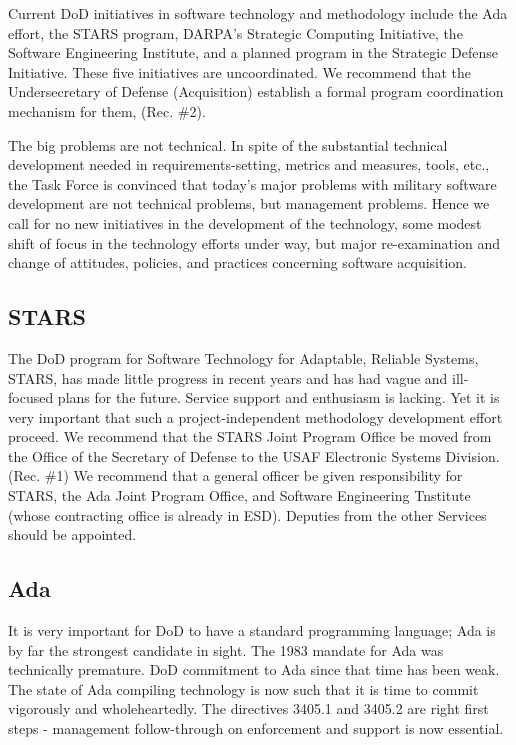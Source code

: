 \documentclass[12pt]{article}
\begin{document}
Current DoD initiatives in software technology and methodology include the Ada
effort, the STARS program, DARPA's Strategic Computing Initiative, the
Software Engineering Institute, and a planned program in the Strategic Defense
Initiative. These five initiatives are uncoordinated. We recommend that the
Undersecretary of Defense (Acquisition) establish a formal program
coordination mechanism for them, (Rec. \#2).

The big problems are not technical. In spite of the substantial technical
development needed in requirements-setting, metrics and measures, tools, etc.,
the Task Force is convinced that today's major problems with military software
development are not technical problems, but management problems. Hence we call
for no new initiatives in the development of the technology, some modest shift
of focus in the technology efforts under way, but major re-examination and
change of attitudes, policies, and practices concerning software acquisition.

\subsection*{STARS}

The DoD program for Software Technology for Adaptable, Reliable Systems,
STARS, has made little progress in recent years and has had vague and
ill-focused plans for the future. Service support and enthusiasm is lacking.
Yet it is very important that such a project-independent methodology
development effort proceed. We recommend that the STARS Joint Program Office
be moved from the Office of the Secretary of Defense to the USAF Electronic
Systems Division. (Rec. \#1) We recommend that a general officer be given
responsibility for STARS, the Ada Joint Program Office, and Software
Engineering Tnstitute (whose contracting office is already in ESD). Deputies
from the other Services should be appointed.

\subsection*{Ada}

It is very important for DoD to have a standard programming language; Ada is
by far the strongest candidate in sight. The 1983 mandate for Ada was
technically premature. DoD commitment to Ada since that time has been weak.
The state of Ada compiling technology is now such that it is time to commit
vigorously and wholeheartedly.  The directives 3405.1 and 3405.2 are right
first steps - management follow-through on enforcement and support is now
essential.
\end{document}
